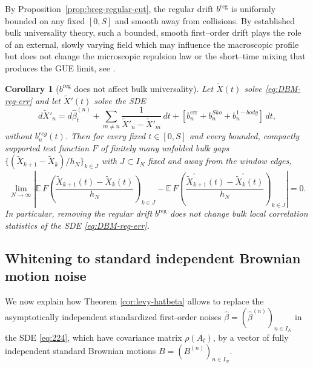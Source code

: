 \documentclass[12pt,reqno]{amsart}
\theoremstyle{plain}
\newtheorem{cor}[prop]{Corollary}
\theoremstyle{definition}
\theoremstyle{remark}
\begin{document}
By Proposition~\ref{prop:breg-regular-cut}, the regular drift $b^{\mathrm{reg}}$ is uniformly bounded
on any fixed $[0,S]$ and smooth away from collisions. By established bulk universality theory, such a bounded, smooth first–order drift plays
the role of an external, slowly varying field which may influence the macroscopic
profile but does not change the microscopic repulsion law or the
short–time mixing that produces the GUE limit, see  \cite{ErdosYau2012,BourgadeErdosYau2014,LandonSosoeYau2017}.

\begin{cor}[$b^{\mathrm{reg}}$ does not affect bulk universality]
\label{cor:breg-harmless} Let $\widetilde X(t)$ solve \eqref{eq:DBM-reg-err}
and let $\widetilde X'(t)$ solve the SDE
\begin{equation}
\label{eq:224}
d\widetilde X'_n
= d\hat\beta^{(n)}_t
+ \sum_{m \neq n}\frac{1}{\widetilde X'_n-\widetilde X'_m}\,dt
+ \left [ b^{\mathrm{err}}_n+ b^{Sko}_n + b^{1-body}_n \right ] \,dt,
\end{equation}
without $b^{reg}_n(t)$. Then for every fixed $t\in[0,S]$ and every bounded, compactly supported test
function $F$ of finitely many unfolded bulk gaps
$\{(\widetilde X_{k+1}-\widetilde X_k)/h_N\}_{k\in J}$ with
$J\subset I_N$ fixed and away from the window edges,
\begin{equation}\label{eq:breg-univ}
\lim_{N\to\infty}
\left|
\mathbb{E}\,F\!\left(\frac{\widetilde X_{k+1}(t)-\widetilde X_k(t)}{h_N}\right)_{k\in J}
-
\mathbb{E}\,F\!\left(\frac{\widetilde X^{'}_{k+1}(t)-\widetilde X^{'}_k(t)}{h_N}\right)_{k\in J}
\right|
= 0 .
\end{equation}
In particular, removing the regular drift $b^{\mathrm{reg}}$ does not change bulk
local correlation statistics of the SDE \eqref{eq:DBM-reg-err}.
\end{cor}

\subsection{Whitening to standard independent Brownian motion noise} We now explain how Theorem \ref{cor:levy-hatbeta} allows to replace the asymptotically independent standardized first-order noises $\hat\beta=(\hat\beta^{(n)})_{n\in I_N}$ in the SDE \eqref{eq:224}, which have covariance
matrix $\rho(A_t)$, by a vector of fully independent standard Brownian motions
$B=(B^{(n)})_{n\in I_N}$.
\end{document}
